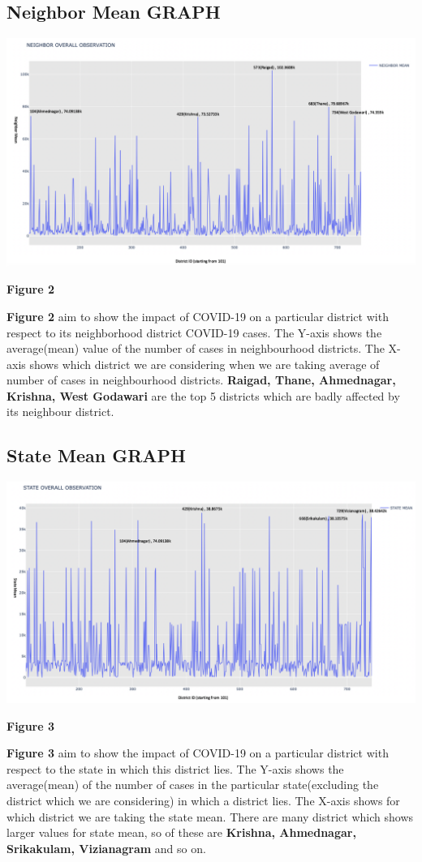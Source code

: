 \documentclass{report}
\begin{document}
\subsection{Neighbor Mean GRAPH}
\includegraphics[scale=0.335]{Neighbor Mean}
\centerline{\textbf{Figure 2}} \newline\newline
\justify \textbf{Figure 2} aim to show the impact of COVID-19 on a particular district with respect to its neighborhood district COVID-19 cases. The Y-axis shows the average(mean) value of the number of cases in neighbourhood districts. The X-axis shows which district we are considering when we are taking average of number of cases in neighbourhood districts. 
\newline \textbf{Raigad, Thane, Ahmednagar, Krishna, West Godawari} are the top 5 districts which are badly affected by its neighbour district.

\newpage    
\subsection{State Mean GRAPH}
\includegraphics[scale=0.32]{State Mean}
\centerline{\textbf{Figure 3}} \newline\newline
\justify \textbf{Figure 3} aim to show the impact of COVID-19 on a particular district with respect to the state in which this district lies. The Y-axis shows the average(mean) of the number of cases in the particular state(excluding the district which we are considering) in which a district lies. The X-axis shows for which district we are taking the state mean.
\newline There are many district which shows larger values for state mean, so of these are \textbf{Krishna, Ahmednagar, Srikakulam, Vizianagram} and so on.
\end{document}
